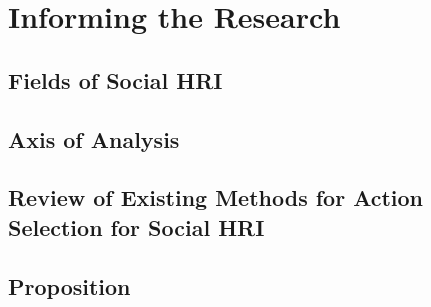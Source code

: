 \chapter{Informing the Research}

\section{Fields of Social HRI}

\section{Axis of Analysis}

\section{Review of Existing Methods for Action Selection for Social HRI}

\section{Proposition}